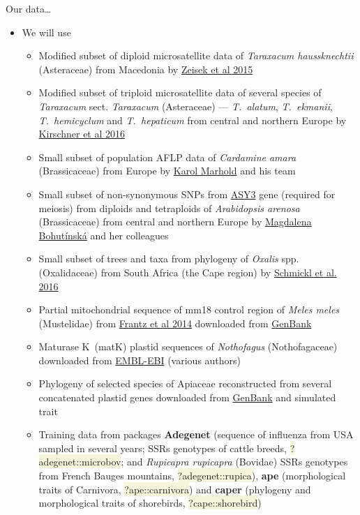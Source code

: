 \documentclass[compress, ucs, xelatex, 11pt, xcolor=svgnames, aspectratio=169,
	hyperref={
		bookmarks=true,
		unicode=true,
		colorlinks=true,
		pdftitle={Molecular data in R},
		plainpages=false,
		pdfauthor={Vojtech Zeisek},
		pdfsubject={Course about phylogeny and evolution in R},
		pdfcreator={XeLaTeX},
		pdfkeywords={R, evolution, phylogeny, molecular data},
		linkcolor=Crimson, %
		anchorcolor=Magenta, %
		citecolor=Magenta, %
		filecolor=Magenta, %
		menucolor=Magenta, %
		urlcolor=DodgerBlue, %
		pdftex},
	url={hyphens, lowtilde} %
	]{beamer}
\renewcommand{\texttt}[1]{\colorbox{Beige}{{\ttfamily #1}}}
\begin{document}
\begin{frame}[allowframebreaks]{Our data\ldots}
	\begin{itemize}
		\item We will use
		\begin{itemize}
			\item Modified subset of diploid microsatellite data of \textit{Taraxacum haussknechtii} (Asteraceae) from Macedonia by \href{https://trapa.cz/en/taraxacum-section-dioszegia}{Zeisek et al 2015}
			\item Modified subset of triploid microsatellite data of several species of \textit{Taraxacum} sect. \textit{Taraxacum} (Asteraceae) --- \textit{T.~alatum}, \textit{T.~ekmanii}, \textit{T.~hemicyclum} and \textit{T.~hepaticum} from central and northern Europe by \href{https://trapa.cz/en/identif-oligoclonal-agamospermous-microsp}{Kirschner et al 2016}
			\item Small subset of population AFLP data of \textit{Cardamine amara} (Brassicaceae) from Europe by \href{https://botany.natur.cuni.cz/brassiploidy/marhold}{Karol Marhold} and his team
			\item Small subset of non-synonymous SNPs from \href{https://www.arabidopsis.org/servlets/TairObject?type=locus&name=At2g46980}{ASY3} gene (required for meiosis) from diploids and tetraploids of \textit{Arabidopsis arenosa} (Brassicaceae) from central and northern Europe by \href{https://botany.natur.cuni.cz/ecolgen/people}{Magdalena Bohutínská} and her colleagues
			\item Small subset of trees and taxa from phylogeny of \textit{Oxalis} spp. (Oxalidaceae) from South Africa (the Cape region) by \href{https://onlinelibrary.wiley.com/doi/full/10.1111/1755-0998.12487}{Schmickl et al. 2016}
			\item Partial mitochondrial sequence of mm18 control region of \textit{Meles meles} (Mustelidae) from \href{https://www.nature.com/articles/hdy201445}{Frantz et al 2014} downloaded from \href{https://www.ncbi.nlm.nih.gov/popset/608602125}{GenBank}
			\item Maturase K~(matK) plastid sequences of \textit{Nothofagus} (Nothofagaceae) downloaded from \href{https://www.ebi.ac.uk/}{EMBL-EBI} (various authors)
			\item Phylogeny of selected species of Apiaceae reconstructed from several concatenated plastid genes downloaded from \href{https://www.ncbi.nlm.nih.gov/}{GenBank} and simulated trait
			\item Training data from packages \textbf{Adegenet} (sequence of influenza from USA sampled in several years; SSRs genotypes of cattle breeds, \texttt{?adegenet::microbov}; and \textit{Rupicapra rupicapra} (Bovidae) SSRs genotypes from French Bauges mountains, \texttt{?adegenet::rupica}), \textbf{ape} (morphological traits of Carnivora, \texttt{?ape::carnivora}) and \textbf{caper} (phylogeny and morphological traits of shorebirds, \texttt{?cape::shorebird})

\end{itemize}
\end{itemize}
\end{frame}
\end{document}
